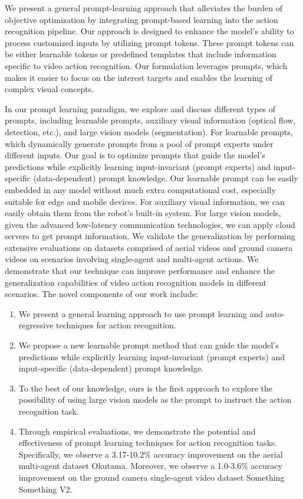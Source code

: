 \documentclass[letterpaper, 10 pt, conference]{ieeeconf}
\begin{document}
We present a general prompt-learning approach that alleviates the burden of objective optimization by integrating prompt-based learning into the action recognition pipeline. Our approach is designed to enhance the model's ability to process customized inputs by utilizing prompt tokens. These prompt tokens can be either learnable tokens or predefined templates that include information specific to video action recognition. Our formulation leverages prompts, which makes it easier to focus on the interest targets and enables the learning of complex visual concepts. 

In our prompt learning paradigm, we explore and discuss different types of prompts, including learnable prompts, auxiliary visual information (optical flow, detection, etc.), and large vision models (segmentation). For learnable prompts, which dynamically generate prompts from a pool of prompt experts under different inputs. Our goal is to optimize prompts that guide the model's predictions while explicitly learning input-invariant (prompt experts) and input-specific (data-dependent) prompt knowledge. Our learnable prompt can be easily embedded in any model without much extra computational cost, especially suitable for edge and mobile devices. For auxiliary visual information, we can easily obtain them from the robot's built-in system. For large vision models, given the advanced low-latency communication technologies, we can apply cloud servers to get prompt information. We validate the generalization by performing extensive evaluations on datasets comprised of aerial videos and ground camera videos on scenarios involving single-agent and multi-agent actions. We demonstrate that our technique can improve performance and enhance the generalization capabilities of video action recognition models in different scenarios. The novel components of our work include:



\begin{enumerate}
    \item We present a general learning approach to use prompt learning and auto-regressive techniques for action recognition.
    \item We propose a new learnable prompt method that can guide the model's predictions while explicitly learning input-invariant (prompt experts) and input-specific (data-dependent) prompt knowledge.
    \item To the best of our knowledge, ours is the first approach to explore the possibility of using large vision models as the prompt to instruct the action recognition task.
    \item Through empirical evaluations, we demonstrate the potential and effectiveness of prompt learning techniques for action recognition tasks. Specifically, we observe a 3.17-10.2\% accuracy improvement on the aerial multi-agent dataset Okutama. Moreover, we observe a 1.0-3.6\% accuracy improvement on the ground camera single-agent video dataset Something Something V2. 
\end{enumerate}
\end{document}
